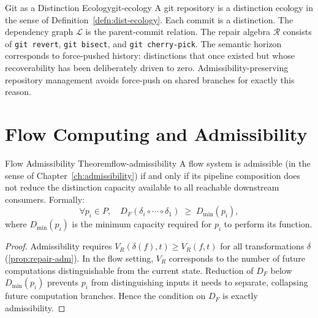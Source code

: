 \documentclass[12pt,twoside,openright]{book}
\newcommand{\csicon} {\marginpar{\tiny\color{DistBlue}\faCode}}
\begin{document}
\begin{example}{Git as a Distinction Ecology}{git-ecology}
  \csicon
  A git repository is a distinction ecology in the sense
  of Definition~\ref{defn:dist-ecology}. Each commit is a
  distinction. The dependency graph $\mathcal{L}$ is the
  parent-commit relation. The repair algebra $\mathcal{R}$
  consists of \texttt{git revert}, \texttt{git bisect},
  and \texttt{git cherry-pick}. The semantic horizon
  corresponds to force-pushed history: distinctions that
  once existed but whose recoverability has been
  deliberately driven to zero. Admissibility-preserving
  repository management avoids force-push on shared
  branches for exactly this reason.
\end{example}

\section{Flow Computing and Admissibility}

\begin{theorem}{Flow Admissibility Theorem}{flow-admissibility}
  A flow system is admissible (in the sense of
  Chapter~\ref{ch:admissibility}) if and only if its
  pipeline composition does not reduce the distinction
  capacity available to all reachable downstream consumers.
  Formally:
  \[
    \forall p_i \in P,\quad
    D_F(\delta_i \circ \cdots \circ \delta_1)
    \;\ge\;
    D_{\min}(p_i),
  \]
  where $D_{\min}(p_i)$ is the minimum capacity
  required for $p_i$ to perform its function.
\end{theorem}

\begin{proof}
  Admissibility requires $V_R(\delta(f), t) \ge V_R(f, t)$
  for all transformations $\delta$
  (\cref{prop:repair-adm}).
  In the flow setting, $V_R$ corresponds to the number of
  future computations distinguishable from the current
  state. Reduction of $D_F$ below $D_{\min}(p_i)$
  prevents $p_i$ from distinguishing inputs it needs to
  separate, collapsing future computation branches.
  Hence the condition on $D_F$ is exactly admissibility.
\end{proof}
\end{document}
